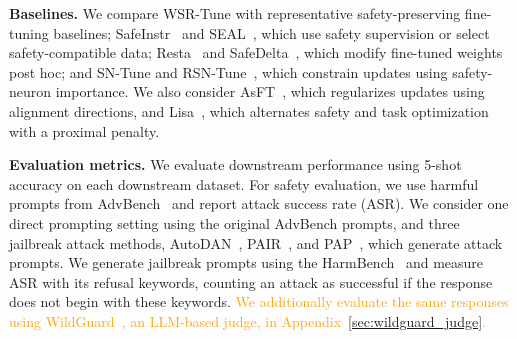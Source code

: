 \documentclass{article}
\newcommand{\djh}[1]{{\leavevmode\color{magenta}[DJ: #1]}}
\newcommand{\kms}[1]{{\leavevmode\color{blue}[MS: #1]}}
\begin{document}



\textbf{Baselines.} We compare WSR-Tune with representative safety-preserving fine-tuning baselines; %
SafeInstr~\citep{safeInstr} and SEAL~\citep{seal}, which use safety supervision or select safety-compatible data; Resta~\citep{Resta} and SafeDelta~\citep{safe-delta}, which modify fine-tuned weights post hoc; and SN-Tune and RSN-Tune~\citep{sn-tune}, which constrain updates using safety-neuron importance. We also consider AsFT~\citep{asft}, which regularizes updates using alignment directions, and Lisa~\citep{lisa}, which alternates safety and task optimization with a proximal penalty. 




\textbf{Evaluation metrics.}
We evaluate downstream performance using 5-shot accuracy on each downstream dataset. For safety evaluation, we use harmful prompts from AdvBench~\citep{advbench} and report attack success rate (ASR). We consider one direct prompting setting using the original AdvBench prompts, and three jailbreak attack methods, AutoDAN~\citep{autodan}, PAIR~\citep{pair}, and PAP~\citep{pap}, which generate attack prompts. We generate jailbreak prompts using the HarmBench~\citep{harmbench} and measure ASR with its refusal keywords, counting an attack as successful if the response does not begin with these keywords. \textcolor{orange}{We additionally evaluate the same responses using WildGuard~\citep{wildguard}, an LLM-based judge, in Appendix~\ref{sec:wildguard_judge}.}
\end{document}
